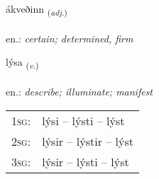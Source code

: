 \documentclass[frontgrid, backgrid]{flacards}\usepackage[]{graphicx}\usepackage[]{xcolor}
\begin{document}
\renewcommand{\blhead}{\vskip5pt {\small\bfseries\footnotesize Lýsingarorð | Adjective }}
\renewcommand{\bcfoot}{\vskip5pt \hspace{2pt}{\small\bfseries\footnotesize 1K}}


{ákveðinn \small{\textsubscript{(\textit{adj.})}} \\[1ex] %
\textphonetic{[auːkʰvɛðɪn]} \\
en.: \emph{certain; determined, firm} \\  [2ex]
\renewcommand*{\arraystretch}{0.8}
}

\renewcommand{\flhead}{\vskip5pt \fboxsep=0pt {\small\bfseries\footnotesize Sagnorð | Verb}}
\renewcommand{\fcfoot}{\vskip5pt \fboxsep=0pt \hspace{2pt}{\small\bfseries\footnotesize 1K}}

\renewcommand{\blhead}{\vskip5pt {\small\bfseries\footnotesize Sagnorð | Verb }}
\renewcommand{\bcfoot}{\vskip5pt \hspace{2pt}{\small\bfseries\footnotesize 1K}}


{lýsa \small{\textsubscript{(\textit{v.})}} \\[1ex] %
\textphonetic{[liːsa]} \\
en.: \emph{describe; illuminate; manifest} \\  [2ex]
\renewcommand*{\arraystretch}{0.8}
\begin{tabular}{p{1cm}l}
\textsc{1sg}: & lýsi -- lýsti -- lýst \\ 
\textsc{2sg}: & lýsir -- lýstir -- lýst \\ 
\textsc{3sg}: & lýsir -- lýsti -- lýst \\ 
\end{tabular}
}
\end{document}
